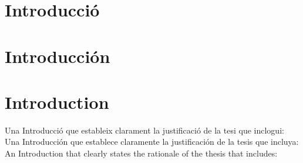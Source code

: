 
\ifcase\doclanguage
\or
  \chapter{Introducció}
\or
  \chapter{Introducción}
\else
  \chapter{Introduction}
\fi

\ifcase\doclanguage
\or
  Una Introducció que estableix clarament la justificació de la tesi que inclogui:
\or
  Una Introducción que establece claramente la justificación de la tesis que incluya:
\else
  An Introduction that clearly states the rationale of the thesis that includes:
\fi

